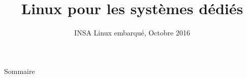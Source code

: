 \documentclass{beamer}
\title[Linux - Systèmes dédiés]
{Linux pour les systèmes dédiés}
\date[Octobre 2016]
{INSA Linux embarqué, Octobre 2016}
\begin{document}
\begin{frame}
  \titlepage
\end{frame}

\begin{frame}{Sommaire}
  \tableofcontents
\end{frame}








\end{document}
